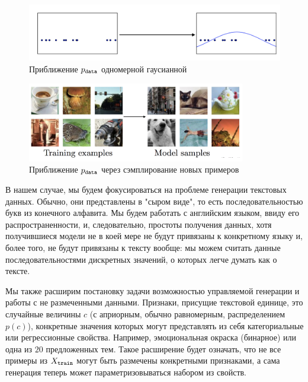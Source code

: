 \documentclass{spbau-diploma}
\begin{document}
\begin{figure}[H]
\centering
\includegraphics[width=\textwidth]{images/density_estimation.png}
\caption{Приближение $p_{\texttt{data}}$ одномерной гаусианной~\cite{1701.00160}}
\label{density_estimation}
\end{figure}

\begin{figure}[H]
\centering
\includegraphics[width=0.85\textwidth]{images/density_samples.png}
\caption{Приближение $p_{\texttt{data}}$ через сэмплирование новых примеров~\cite{1701.00160}}
\label{density_samples}
\end{figure}

В нашем случае, мы будем фокусироваться на проблеме генерации текстовых данных.
Обычно, они представлены в "сыром виде", то есть последовательностью
букв из конечного алфавита. Мы будем работать с английским языком, 
ввиду его распространенности, и, следовательно, простоты получения данных, хотя 
получившиеся модели не в коей мере не будут привязаны к конкретному языку и, 
более того, не будут привязаны к тексту вообще: мы можем считать данные 
последовательностями дискретных значений, о которых легче думать как о тексте.

Мы также расширим постановку задачи возможностью управляемой генерации и работы
с не размеченными данными. Признаки, присущие текстовой единице, это случайные 
величины $c$ (с априорным, обычно равномерным, распределением $p(c)$), 
конкретные значения которых могут представлять из себя категориальные 
или регрессионные свойства. Например, эмоциональная окраска (бинарное) или одна 
из $20$ предложенных тем. 
Такое расширение будет означать, что не все примеры из $X_{\texttt{train}}$ могут быть 
размечены конкретными признаками, а сама генерация теперь может 
параметризовываться набором из свойств.
\end{document}
